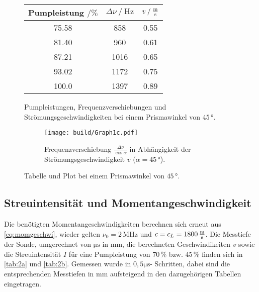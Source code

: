 \begin{figure}
    \begin{subtable}{0.43\textwidth}
        \centering
       \begin{tabular}{c c c}
        \toprule 
        {Pumpleistung $\mathbin{/}\%$} & {$\Delta \nu \mathbin{/} \unit{\hertz}$} & {$v \mathbin{/} \unit{\frac{\meter}{\second}}$}  \\
        \midrule 
                75.58   &     858   & 0.55 \\
                81.40   &     960   & 0.61 \\
                87.21   &     1016  & 0.65 \\
                93.02   &     1172  & 0.75 \\
                100.0   &     1397  & 0.89 \\
        \bottomrule
       \end{tabular}
       \caption{Pumpleistungen, Frequenzverschiebungen und Strömungsgeschwindigkeiten bei einem Prismawinkel von $45 \,°$.}
        \label{tab:1winkel3}
    \end{subtable}
    \begin{subfigure}{0.57\textwidth} 
        \centering
        \texttt{[image: build/Graph1c.pdf]}  
        \caption{Frequenzverschiebung $\frac{\Delta \nu}{\cos\alpha}$ in Abhängigkeit der Strömungsgeschwindigkeit $v$ ($\alpha = 45 \,°$).}
        \label{fig:graph1c}
        \qquad
    \end{subfigure}
    \caption{Tabelle und Plot bei einem Prismawinkel von $45 \,°$.} 
\end{figure}    

\subsection{Streuintensität und Momentangeschwindigkeit}

Die benötigten Momentangeschwindigkeiten berechnen sich erneut aus \eqref{eq:momgeschwi}, wieder gelten $\nu_0 = 2 \,\unit{\mega\hertz}$ und $c = c_L = 1800 \,\unit{\frac{\meter}{\second}}$.
Die Messtiefe der Sonde, umgerechnet von $\unit{\micro\second}$ in $\unit{\milli\meter}$, die berechneten Geschwindikeiten $v$ sowie die Streuintensität $I$ für eine Pumpleistung von $70 \,\%$ bzw. $45 \,\%$ finden sich in \autoref{tab:2a} und \autoref{tab:2b}.
Gemessen wurde in $0,5 \unit{\micro\second}$- Schritten, dabei sind die entsprechenden Messtiefen in $\unit{\milli\meter}$ aufsteigend in den dazugehörigen Tabellen eingetragen. \\

